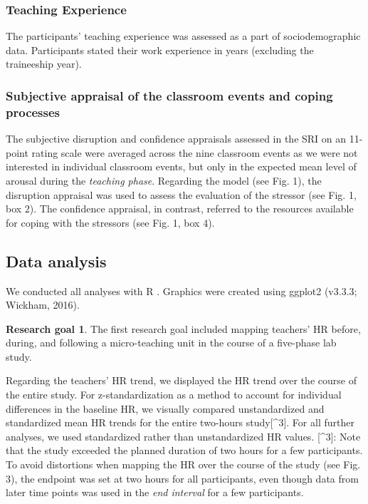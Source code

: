 \documentclass[preprint, 3p,
authoryear]{elsarticle} %
\begin{document}
\subsubsection{Teaching Experience}\label{teaching-experience}

The participants' teaching experience was assessed as a part of
sociodemographic data. Participants stated their work experience in
years (excluding the traineeship year).

\subsubsection{Subjective appraisal of the classroom events and coping
processes}\label{subjective-appraisal-of-the-classroom-events-and-coping-processes}

The subjective disruption and confidence appraisals assessed in the SRI
on an 11-point rating scale were averaged across the nine classroom
events as we were not interested in individual classroom events, but
only in the expected mean level of arousal during the \emph{teaching
phase}. Regarding the model (see Fig. 1), the disruption appraisal was
used to assess the evaluation of the stressor (see Fig. 1, box 2). The
confidence appraisal, in contrast, referred to the resources available
for coping with the stressors (see Fig. 1, box 4).

\subsection{Data analysis}\label{data-analysis}

We conducted all analyses with R \citep{RStudio2020}. Graphics were
created using ggplot2 (v3.3.3; Wickham, 2016).

\textbf{Research goal 1}. The first research goal included mapping
teachers' HR before, during, and following a micro-teaching unit in the
course of a five-phase lab study.

Regarding the teachers' HR trend, we displayed the HR trend over the
course of the entire study. For z-standardization as a method to account
for individual differences in the baseline HR, we visually compared
unstandardized and standardized mean HR trends for the entire two-hours
study{[}\^{}3{]}. For all further analyses, we used standardized rather
than unstandardized HR values. {[}\^{}3{]}: Note that the study exceeded
the planned duration of two hours for a few participants. To avoid
distortions when mapping the HR over the course of the study (see Fig.
3), the endpoint was set at two hours for all participants, even though
data from later time points was used in the \emph{end interval} for a
few participants.
\end{document}
